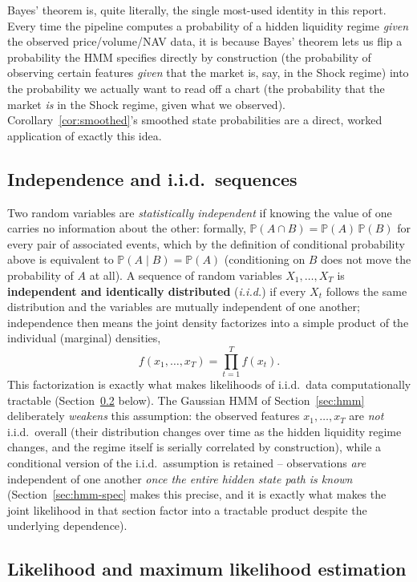 \documentclass[11pt]{article}
\theoremstyle{definition}
\theoremstyle{remark}
\begin{document}
Bayes' theorem is, quite literally, the single most-used identity in this report. Every time the pipeline computes a probability of a hidden liquidity regime \emph{given} the observed price/volume/NAV data, it is because Bayes' theorem lets us flip a probability the HMM specifies directly by construction (the probability of observing certain features \emph{given} that the market is, say, in the Shock regime) into the probability we actually want to read off a chart (the probability that the market \emph{is} in the Shock regime, given what we observed). Corollary~\ref{cor:smoothed}'s smoothed state probabilities are a direct, worked application of exactly this idea.

\subsection{Independence and i.i.d.\ sequences}

Two random variables are \emph{statistically independent} if knowing the value of one carries no information about the other: formally, $\mathbb{P}(A\cap B)=\mathbb{P}(A)\,\mathbb{P}(B)$ for every pair of associated events, which by the definition of conditional probability above is equivalent to $\mathbb{P}(A\mid B)=\mathbb{P}(A)$ (conditioning on $B$ does not move the probability of $A$ at all). A sequence of random variables $X_1,\dots,X_T$ is \textbf{independent and identically distributed} (\emph{i.i.d.}) if every $X_t$ follows the same distribution and the variables are mutually independent of one another; independence then means the joint density factorizes into a simple product of the individual (marginal) densities,
\[
f(x_1,\dots,x_T) = \prod_{t=1}^{T}f(x_t).
\]
This factorization is exactly what makes likelihoods of i.i.d.\ data computationally tractable (Section~\ref{sec:mle} below). The Gaussian HMM of Section~\ref{sec:hmm} deliberately \emph{weakens} this assumption: the observed features $x_1,\dots,x_T$ are \emph{not} i.i.d.\ overall (their distribution changes over time as the hidden liquidity regime changes, and the regime itself is serially correlated by construction), while a conditional version of the i.i.d.\ assumption is retained -- observations \emph{are} independent of one another \emph{once the entire hidden state path is known} (Section~\ref{sec:hmm-spec} makes this precise, and it is exactly what makes the joint likelihood in that section factor into a tractable product despite the underlying dependence).

\subsection{Likelihood and maximum likelihood estimation}
\label{sec:mle}
\end{document}
